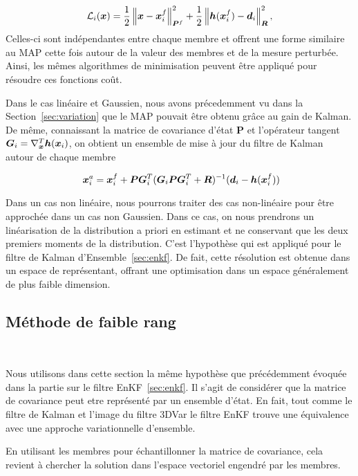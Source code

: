 \begin{equation*}
    \mathcal L_i(\bm x) = \frac12 \left\lVert \bm x -\bm x^f_i \right\rVert^2_{\bm P^f} + \frac12 \left\lVert \bm h(\bm x^f_i) - \bm d_i \right\rVert_{\bm R}^2,
\end{equation*}Celles-ci sont indépendantes entre chaque membre et offrent une forme similaire au MAP cette fois autour de la valeur des membres et de la mesure perturbée. Ainsi, les mêmes algorithmes de minimisation peuvent être appliqué pour résoudre ces fonctions coût.

Dans le cas linéaire et Gaussien, nous avons précedemment vu dans la Section~\ref{sec:variation} que le MAP pouvait être obtenu grâce au gain de Kalman. De même, connaissant la matrice de covariance d'état $\bm P$ et l'opérateur tangent $\bm G_i = \nabla^T_{\bm{x}} \bm h(\bm{x}_i)$, on obtient un ensemble de mise à jour du filtre de Kalman autour de chaque membre

\begin{equation}~\label{eq:rml-kalman}
    \bm x ^a_i = \bm x^f_i + \bm P \bm G_i^T (\bm G_i \bm{P} \bm G_i^T + \bm{R})^{-1} (\bm{d}_i - \bm h(\bm{x}_i^f))
\end{equation}

Dans un cas non linéaire, nous pourrons traiter des cas non-linéaire pour être approchée dans un cas non Gaussien. Dans ce cas, on nous prendrons un linéarisation de la distribution a priori en estimant et ne conservant que les deux premiers moments de la distribution. C'est l'hypothèse qui est appliqué pour le filtre de Kalman d'Ensemble~\ref{sec:enkf}. De fait, cette résolution est obtenue dans un espace de représentant, offrant une optimisation dans un espace généralement de plus faible dimension.

\subsection{Méthode de faible rang}~\label{sec:faible_rang}

Nous utilisons dans cette section la même hypothèse que précédemment évoquée dans la partie sur le filtre EnKF~\ref{sec:enkf}. Il s'agit de considérer que la matrice de covariance peut etre représenté par un ensemble d'état. En fait, tout comme le filtre de Kalman et l'image du filtre 3DVar le filtre EnKF trouve une équivalence avec une approche variationnelle d'ensemble.

En utilisant les membres pour échantillonner la matrice de covariance, cela revient à chercher la solution dans l'espace vectoriel engendré par les membres.

